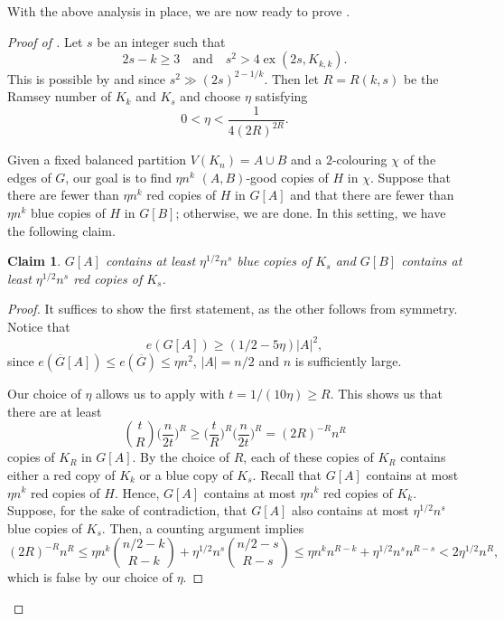 \documentclass[a4paper,reqno,11pt]{amsart}
\newtheorem{claim}[theorem]{Claim}
\theoremstyle{definition}
\theoremstyle{remark}
\renewcommand\le{\leqslant}
\renewcommand\ge{\geqslant}
\begin{document}
With the above analysis in place, we are now ready to prove .

\begin{proof}[Proof of ]
Let $s$ be an integer such that
\begin{equation}\label{eq:BoundOnS}
2s - k \ge 3\quad\text{and}\quad s^2 > 4\operatorname{ex}(2s,K_{k,k}).
\end{equation}
This is possible by  and since $s^2 \gg (2s)^{2-1/k}$. Then let $R=R(k,s)$ be the Ramsey number of $K_k$ and $K_s$ and choose $\eta$ satisfying
\[0<\eta < \frac{1}{4(2R)^{2R}}.\]

Given a fixed balanced partition $V(K_n)=A \cup B$ and a $2$-colouring $\chi$ of the edges of $G$, our goal is to find $\eta n^{k}$ $(A,B)$-good copies of $H$ in $\chi$. Suppose that there are fewer than $\eta n^{k}$ red copies of $H$ in $G[A]$ and that there are fewer than $\eta n^{k}$ blue copies of $H$ in $G[B]$; otherwise, we are done. In this setting, we have the following claim. 

\begin{claim}\label{claim:Kscopies}
$G[A]$ contains at least $\eta^{1/2} n^s$ blue copies of $K_s$ and $G[B]$ contains at least $\eta^{1/2} n^s$ red copies of $K_s$.
\end{claim}

\begin{proof} It suffices to show the first statement, as the other follows from symmetry. 
Notice that
\[e(G[A]) \ge (1/2 - 5\eta)|A|^2,\]
since $e(\overline{G}[A]) \le e(\overline{G}) \le \eta n^2$, $|A|=n/2$ and $n$ is sufficiently large.

Our choice of $\eta$ allows us to apply  with $t = 1/(10\eta) \ge R$. This shows us that there are at least 
\[\binom{t}{R}\bigg(\frac{n}{2t}\bigg)^R \ge \bigg(\frac{t}{R}\bigg)^R\bigg(\frac{n}{2t}\bigg)^R = (2R)^{-R}n^R\]
copies of $K_R$ in $G[A]$. By the choice of $R$, each of these copies of $K_R$ contains either a red copy of $K_k$ or a blue copy of $K_s$. Recall that $G[A]$ contains at most $\eta n^{k}$ red copies of $H$. Hence, $G[A]$ contains at most $\eta n^{k}$ red copies of $K_k$. Suppose, for the sake of contradiction, that $G[A]$ also contains at most $\eta^{1/2} n^s$ blue copies of $K_s$. Then, a counting argument implies
\[(2R)^{-R} n^R \le\eta n^k\binom{n/2-k}{R-k} + \eta^{1/2} n^s\binom{n/2-s}{R-s} \le \eta n^kn^{R-k} + \eta^{1/2} n^sn^{R-s} < 2\eta^{1/2} n^R,\]
which is false by our choice of $\eta$.
\end{proof}


\end{proof}
\end{document}
